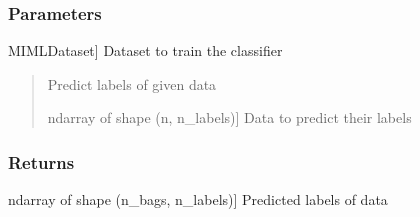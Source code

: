 \documentclass[letterpaper,10pt,english]{sphinxmanual}
\begin{document}
\begin{fulllineitems}
\begin{fulllineitems}
\subsubsection{Parameters}
\label{\detokenize{classifier/_autosummary/miml.classifier.miml_classifier.MIMLClassifier:id2}}\begin{description}
\sphinxlineitem{dataset\_train}{[}MIMLDataset{]}
\sphinxAtStartPar
Dataset to train the classifier

\end{description}

\end{fulllineitems}


\begin{fulllineitems}
\label{\detokenize{classifier/_autosummary/miml.classifier.miml_classifier.MIMLClassifier:miml.classifier.miml_classifier.MIMLClassifier.predict}}
\pysigstartsignatures
{}
\pysigstopsignatures\begin{quote}

\sphinxAtStartPar
Predict labels of given data
\begin{description}
\sphinxlineitem{x}{[}ndarray of shape (n, n\_labels){]}
\sphinxAtStartPar
Data to predict their labels

\end{description}
\end{quote}


\subsubsection{Returns}
\label{\detokenize{classifier/_autosummary/miml.classifier.miml_classifier.MIMLClassifier:id3}}\begin{description}
\sphinxlineitem{results}{[}ndarray of shape (n\_bags, n\_labels){]}
\sphinxAtStartPar
Predicted labels of data

\end{description}

\end{fulllineitems}



\end{fulllineitems}
\end{document}
